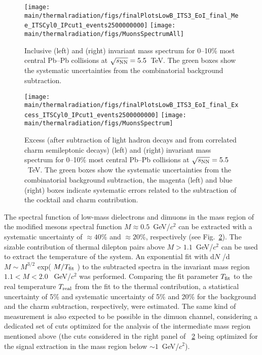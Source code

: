 \documentclass[../report.tex]{subfiles}
\providecommand{\main}{..}
\begin{document}
\begin{figure}[htb]
\centering
\texttt{[image: \\main/thermalradiation/figs/finalPlotsLowB\_ITS3\_EoI\_final\_Mee\_ITSCyl0\_IPcut1\_events2500000000]}
\texttt{[image: \\main/thermalradiation/figs/MuonsSpectrumAll]}
\caption{Inclusive \Pepem (left) and \PGmpGmm (right) invariant mass spectrum for 0--10\% most central Pb--Pb collisions at $\sqrt{s_{\rm NN}} = 5.5$~TeV. The green boxes show the systematic uncertainties from the combinatorial background subtraction.}
\label{fig:DileptonsSpectra}
\end{figure}

\begin{figure}[htb]
\centering
\texttt{[image: \\main/thermalradiation/figs/finalPlotsLowB\_ITS3\_EoI\_final\_Excess\_ITSCyl0\_IPcut1\_events2500000000]}
\texttt{[image: \\main/thermalradiation/figs/MuonsSpectrum]}
\caption{Excess (after subtraction of light hadron decays and from correlated charm semileptonic decays) \Pepem (left) and \PGmpGmm (right) invariant mass spectrum for 0--10\% most central Pb--Pb collisions at $\sqrt{s_{\rm NN}} = 5.5$~TeV. The green boxes show the systematic uncertainties from the combinatorial background subtraction, the magenta (left) and blue (right) boxes indicate systematic errors related to the subtraction of the cocktail and charm contribution.}
\label{fig:DileptonsSpectraSubtracted}
\end{figure}

The spectral function of low-mass dielectrons and dimuons in the mass region of the modified \Prho mesons spectral function $M\approx0.5$~GeV/$c^2$ can be extracted with a systematic uncertainty of $\approx 40$\% and $\approx 20$\%, respectively (see Fig.~\ref{fig:DileptonsSpectraSubtracted}). 
The sizable contribution of thermal dilepton pairs above $M>1.1$~GeV/$c^2$ can be used to extract the temperature of the system. An exponential fit with d$N$ /d$M \sim  M^{3/2}$ exp( $M /T_{\rm fit}$ ) to the subtracted \Pepem spectra in the invariant mass region $1.1 < M < 2.0$ ~GeV/$c^2$ was performed. Comparing the fit parameter $T_{\rm fit}$ to the real temperature $T_{\rm real}$ from the fit to the thermal contribution, a statistical uncertainty of 5\% and systematic uncertainty of 5\% and 20\% for the background and the charm subtraction, respectively, were estimated. The same kind of measurement is also expected to be possible in the dimuon channel, considering a dedicated set of cuts optimized for the analysis of the intermediate mass region mentioned above (the cuts considered in the right panel of \figurename~\ref{fig:DileptonsSpectraSubtracted} being optimized for the signal extraction in the mass region below $\sim 1$~GeV/$c^2$).
\end{document}
